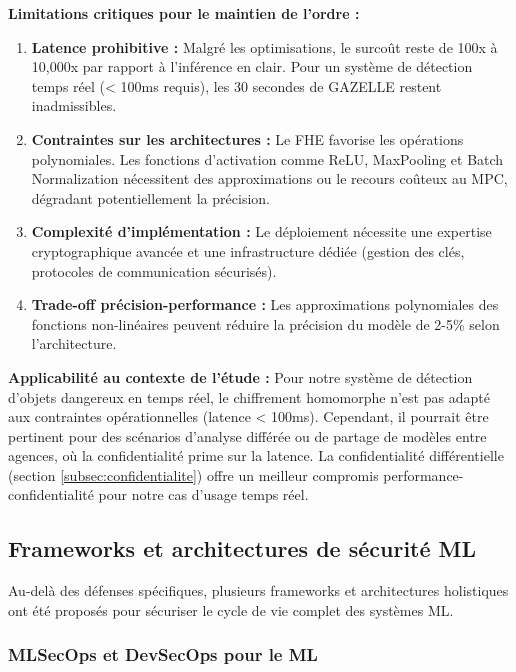 \textbf{Limitations critiques pour le maintien de l'ordre :}
\begin{enumerate}
    \item \textbf{Latence prohibitive :} Malgré les optimisations, le surcoût reste de 100x à 10,000x par rapport à l'inférence en clair. Pour un système de détection temps réel (< 100ms requis), les 30 secondes de GAZELLE restent inadmissibles.

    \item \textbf{Contraintes sur les architectures :} Le FHE favorise les opérations polynomiales. Les fonctions d'activation comme ReLU, MaxPooling et Batch Normalization nécessitent des approximations ou le recours coûteux au MPC, dégradant potentiellement la précision.

    \item \textbf{Complexité d'implémentation :} Le déploiement nécessite une expertise cryptographique avancée et une infrastructure dédiée (gestion des clés, protocoles de communication sécurisés).

    \item \textbf{Trade-off précision-performance :} Les approximations polynomiales des fonctions non-linéaires peuvent réduire la précision du modèle de 2-5\% selon l'architecture.
\end{enumerate}

\textbf{Applicabilité au contexte de l'étude :} Pour notre système de détection d'objets dangereux en temps réel, le chiffrement homomorphe n'est pas adapté aux contraintes opérationnelles (latence < 100ms). Cependant, il pourrait être pertinent pour des scénarios d'analyse différée ou de partage de modèles entre agences, où la confidentialité prime sur la latence. La confidentialité différentielle (section \ref{subsec:confidentialite}) offre un meilleur compromis performance-confidentialité pour notre cas d'usage temps réel.

\subsection{Frameworks et architectures de sécurité ML}
\label{subsec:frameworks}

Au-delà des défenses spécifiques, plusieurs frameworks et architectures holistiques ont été proposés pour sécuriser le cycle de vie complet des systèmes ML.

\subsubsection{MLSecOps et DevSecOps pour le ML}

